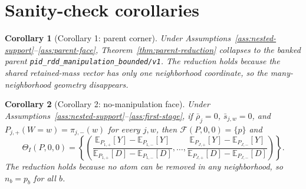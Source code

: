 \documentclass[11pt]{article}
\newcommand{\E}{\mathbb{E}}
\theoremstyle{definition}
\theoremstyle{plain}
\newtheorem{corollary}{Corollary}
\theoremstyle{remark}
\begin{document}
\section{Sanity-check corollaries}
\begin{corollary}[Corollary 1: parent corner]\label{cor:parent-corner}
Under Assumptions~\ref{ass:nested-support}--\ref{ass:parent-face},
Theorem~\ref{thm:parent-reduction} collapses to the banked parent
\texttt{pid\_rdd\_manipulation\_bounded/v1}. The reduction holds because the shared retained-mass
vector has only one neighborhood coordinate, so the many-neighborhood geometry disappears.
\end{corollary}

\begin{corollary}[Corollary 2: no-manipulation face]\label{cor:no-manip}
Under Assumptions~\ref{ass:nested-support}--\ref{ass:first-stage}, if \(\bar\rho_j=0\),
\(\bar s_{j,w}=0\), and \(P_{j,+}(W=w)=\pi_{j,-}(w)\) for every \(j,w\), then
\(\mathcal F(P,0,0)=\{p\}\) and
\[
  \Theta_I(P,0,0)
  =
  \left\{
    \left(
      \frac{\E_{P_{1,+}}[Y]-\E_{P_{1,-}}[Y]}{\E_{P_{1,+}}[D]-\E_{P_{1,-}}[D]},
      \ldots,
      \frac{\E_{P_{J,+}}[Y]-\E_{P_{J,-}}[Y]}{\E_{P_{J,+}}[D]-\E_{P_{J,-}}[D]}
    \right)
  \right\}.
\]
The reduction holds because no atom can be removed in any neighborhood, so \(n_b=p_b\) for all
\(b\).
\end{corollary}
\end{document}
